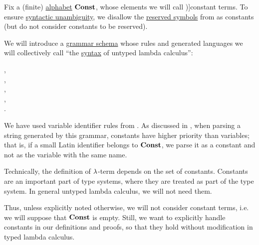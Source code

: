 \begin{definition}\label{def:lambda_term}\mimprovised
  Fix a (finite) \hyperref[def:formal_language/alphabet]{alphabet} \( \op*{Const} \), whose elements we will call \term[en=constant (\cite[202]{Andrews2002Logic})]{constant terms}. To ensure \hyperref[def:grammar_ambiguity]{syntactic unambiguity}, we disallow the \hyperref[con:reserved_symbol]{reserved symbols} from  as constants (but do not consider constants to be reserved).

  We will introduce a \hyperref[def:formal_grammar/schema]{grammar schema} whose rules and generated languages we will collectively call \enquote{the \hyperref[con:syntax_semantics_duality]{syntax} of untyped lambda calculus}:
  \begin{bnf*}
        {}, \\
            { \bnfor {}}, \\
     {\bnftsq{\( ( \)} \bnfsp {} \bnfsp {} \bnfsp \bnftsq{\( ) \)}}, \\
     {\bnftsq{\( ( \)} \bnfsp \bnftsq{\( \synlambda \)} \bnfsp {} \bnfsp {} \bnfsp {} \bnfsp \bnftsq{\( ) \)}}, \\
            { \bnfor {} \bnfor {}}.
  \end{bnf*}

  We have used variable identifier rules from . As discussed in , when parsing a string generated by this grammar, constants have higher priority than variables; that is, if a small Latin identifier belongs to \( \op*{Const} \), we parse it as a constant and not as the variable with the same name.

  \begin{thmenum}
     Technically, the definition of \( {\mathrm \lambda} \)-term depends on the set of constants. Constants are an important part of type systems, where they are treated as part of the type system. In general untyped lambda calculus, we will not need them.

    Thus, unless explicitly noted otherwise, we will not consider constant terms, i.e. we will suppose that \( \op*{Const} \) is empty. Still, we want to explicitly handle constants in our definitions and proofs, so that they hold without modification in typed lambda calculus.


\end{thmenum}
\end{definition}

